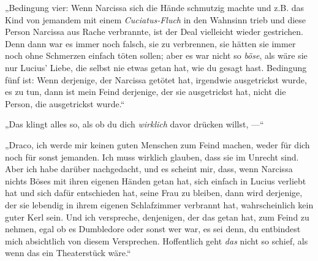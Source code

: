 „Bedingung vier: Wenn Narcissa sich die Hände schmutzig machte und z.B. das Kind von jemandem mit einem \emph{Cuciatus-Fluch} in den Wahnsinn trieb und diese Person Narcissa aus Rache verbrannte, ist der Deal vielleicht wieder gestrichen. Denn dann war es immer noch falsch, sie zu verbrennen, sie hätten sie immer noch ohne Schmerzen einfach töten sollen; aber es war nicht so \emph{böse}, als wäre sie nur Lucius’ Liebe, die selbst nie etwas getan hat, wie du gesagt hast. Bedingung fünf ist: Wenn derjenige, der Narcissa getötet hat, irgendwie ausgetrickst wurde, es zu tun, dann ist mein Feind derjenige, der sie ausgetrickst hat, nicht die Person, die ausgetrickst wurde.“

„Das klingt alles so, als ob du dich \emph{wirklich} davor drücken willst, —“

„Draco, ich werde mir keinen guten Menschen zum Feind machen, weder für dich noch für sonst jemanden. Ich muss wirklich glauben, dass sie im Unrecht sind. Aber ich habe darüber nachgedacht, und es scheint mir, dass, wenn Narcissa nichts Böses mit ihren eigenen Händen getan hat, sich einfach in Lucius verliebt hat und sich dafür entschieden hat, seine Frau zu bleiben, dann wird derjenige, der sie lebendig in ihrem eigenen Schlafzimmer verbrannt hat, wahrscheinlich kein guter Kerl sein. Und ich verspreche, denjenigen, der das getan hat, zum Feind zu nehmen, egal ob es Dumbledore oder sonst wer war, es sei denn, du entbindest mich absichtlich von diesem Versprechen. Hoffentlich geht \emph{das} nicht so schief, als wenn das ein Theaterstück wäre.“

